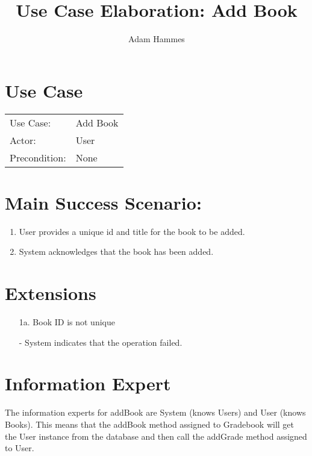 \documentclass{article}
\title{Use Case Elaboration: Add Book}
\author{Adam Hammes}
\begin{document}
\maketitle

\section*{Use Case}
\begin{tabular}{l l}
  Use Case:     & Add Book    \\
  Actor:        & User        \\
  Precondition: & None \\
\end{tabular}

\section*{Main Success Scenario:}
\begin{enumerate}
  \item User provides a unique id and title for the book to be added.
  \item System acknowledges that the book has been added.
\end{enumerate}

\section*{Extensions}
\begin{itemize}
  \item [1a.] Book ID is not unique

    - System indicates that the operation failed.
\end{itemize}

\section*{Information Expert}

The information experts for addBook are System (knows Users) and User (knows
Books).
This means that the addBook method assigned to Gradebook will get the User
instance from the database and then call the addGrade method assigned to User.
\end{document}
